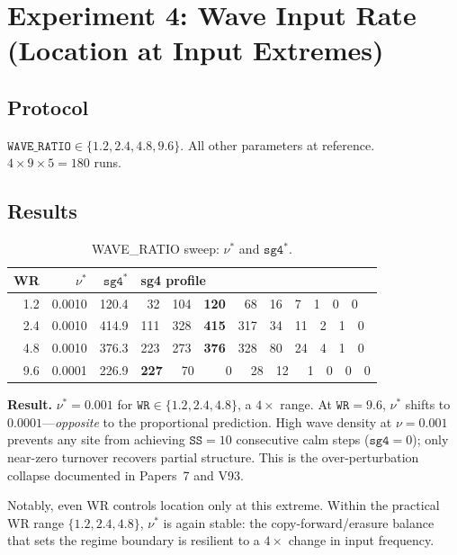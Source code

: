 \documentclass[11pt]{article}
\theoremstyle{remark}
\begin{document}
\section{Experiment 4: Wave Input Rate (Location at Input Extremes)}

\subsection{Protocol}

$\mathtt{WAVE\_RATIO} \in \{1.2, 2.4, 4.8, 9.6\}$. All other parameters at
reference. $4 \times 9 \times 5 = 180$ runs.

\subsection{Results}

\begin{table}[h]
\centering
\caption{WAVE\_RATIO sweep: $\nu^*$ and $\mathtt{sg4}^*$.}
\label{tab:exp4}
\begin{tabular}{r r r l}
\toprule
WR & $\nu^*$ & $\mathtt{sg4}^*$ & sg4 profile \\
\midrule
1.2 & 0.0010 & 120.4 & \ 32\ \ 104\ \ \textbf{120}\ \ \ 68\ \ 16\ \ 7\ \ 1\ \ 0\ \ 0 \\
2.4 & 0.0010 & 414.9 & 111\ \ 328\ \ \textbf{415}\ \ 317\ \ 34\ \ 11\ \ 2\ \ 1\ \ 0 \\
4.8 & 0.0010 & 376.3 & 223\ \ 273\ \ \textbf{376}\ \ 328\ \ 80\ \ 24\ \ 4\ \ 1\ \ 0 \\
9.6 & 0.0001 & 226.9 & \textbf{227}\ \ \ 70\ \ \ \ \ 0\ \ \ 28\ \ 12\ \ \ 1\ \ 0\ \ 0\ \ 0 \\
\bottomrule
\end{tabular}
\end{table}

\textbf{Result.} $\nu^* = 0.001$ for $\mathtt{WR} \in \{1.2, 2.4, 4.8\}$, a
$4\times$ range. At $\mathtt{WR} = 9.6$, $\nu^*$ shifts to $0.0001$---\emph{opposite}
to the proportional prediction. High wave density at $\nu = 0.001$ prevents any
site from achieving $\mathtt{SS} = 10$ consecutive calm steps ($\mathtt{sg4} = 0$);
only near-zero turnover recovers partial structure. This is the over-perturbation
collapse documented in Papers~7 and V93.

Notably, even WR controls location only at this extreme. Within the practical
WR range $\{1.2, 2.4, 4.8\}$, $\nu^*$ is again stable: the copy-forward/erasure
balance that sets the regime boundary is resilient to a $4\times$ change in input
frequency.
\end{document}
